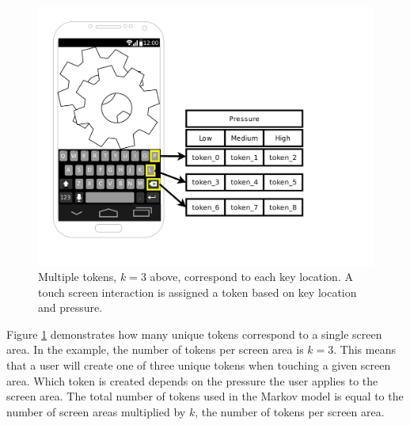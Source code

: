 \documentclass{acm_proc_article-sp}
\begin{document}
\begin{figure}
\centering
\includegraphics[width=.45\textwidth, keepaspectratio]{phone_tokens.pdf}
\caption{
Multiple tokens, $k=3$ above, correspond to each key location.
A touch screen interaction is assigned a token based on
key location and pressure.
}
\label{fig:phone_tokens}
\end{figure}

Figure \ref{fig:phone_tokens} demonstrates how
many unique tokens correspond to a single screen area.
In the example, the number of tokens per screen area is $k=3$.
This means that a user will create one of three unique tokens
when touching a given screen area.
Which token is created depends on the pressure 
the user applies to the screen area.
The total number of tokens used in the Markov model is equal
to the number of screen areas multiplied by $k$,
the number of tokens per screen area.




\end{document}
